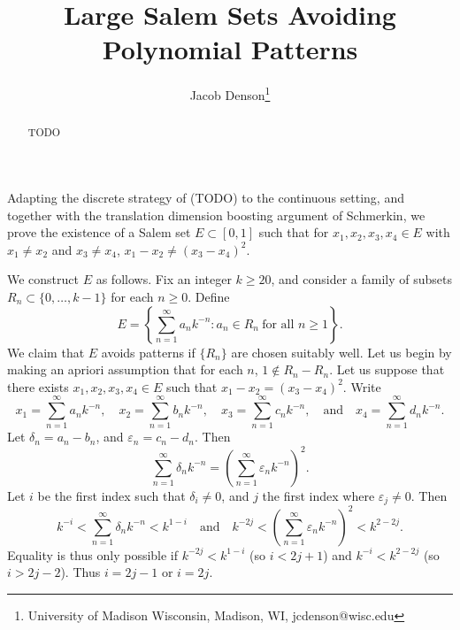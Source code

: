 \documentclass[dvipsnames,letterpaper,12pt]{article}
\title{Large Salem Sets Avoiding Polynomial Patterns}
\author{Jacob Denson\footnote{University of Madison Wisconsin, Madison, WI, jcdenson@wisc.edu}}
\numberwithin{equation}{section}
\numberwithin{theorem}{section}
\begin{document}
\maketitle

\begin{abstract}
    TODO
\end{abstract}

Adapting the discrete strategy of (TODO) to the continuous setting, and together with the translation dimension boosting argument of Schmerkin, we prove the existence of a Salem set $E \subset [0,1]$ such that for $x_1,x_2,x_3,x_4 \in E$ with $x_1 \neq x_2$ and $x_3 \neq x_4$, $x_1 - x_2 \neq (x_3 - x_4)^2$.

We construct $E$ as follows. Fix an integer $k \geq 20$, and consider a family of subsets $R_n \subset \{ 0, \dots, k-1 \}$ for each $n \geq 0$. Define
%
\[ E = \left\{ \sum_{n = 1}^\infty a_n k^{-n} : a_n \in R_n\ \text{for all $n \geq 1$} \right\}. \]
%
We claim that $E$ avoids patterns if $\{ R_n \}$ are chosen suitably well. Let us begin by making an apriori assumption that for each $n$, $1 \not \in R_n - R_n$. Let us suppose that there exists $x_1,x_2,x_3,x_4 \in E$ such that $x_1 - x_2 = (x_3 - x_4)^2$. Write
%
\[ x_1 = \sum_{n = 1}^\infty a_n k^{-n}, \quad x_2 = \sum_{n = 1}^\infty b_n k^{-n}, \quad x_3 = \sum_{n = 1}^\infty c_n k^{-n},\quad\text{and}\quad x_4 = \sum_{n = 1}^\infty d_n k^{-n}. \]
%
Let $\delta_n = a_n - b_n$, and $\varepsilon_n = c_n - d_n$. Then
%
\[ \sum_{n = 1}^\infty \delta_n k^{-n} = \left( \sum_{n = 1}^\infty \varepsilon_n k^{-n} \right)^2. \]
%
Let $i$ be the first index such that $\delta_i \neq 0$, and $j$ the first index where $\varepsilon_j \neq 0$. Then
%
\[ k^{-i} < \sum_{n = 1}^\infty \delta_n k^{-n} < k^{1-i} \quad\text{and}\quad k^{-2j} < \left( \sum_{n = 1}^\infty \varepsilon_n k^{-n} \right)^2 < k^{2-2j}. \]
%
%
Equality is thus only possible if $k^{-2j} < k^{1-i}$ (so $i < 2j + 1$) and $k^{-i} < k^{2-2j}$ (so $i > 2j - 2$). Thus $i = 2j - 1$ or $i = 2j$.
\end{document}
